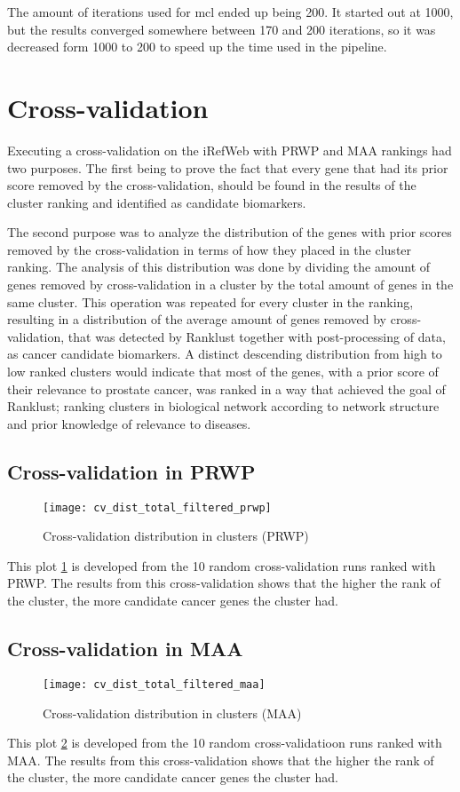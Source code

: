 The amount of iterations used for \gls{mcl} ended up being 200. It started out
at 1000, but the results converged somewhere between 170 and 200 iterations, so
it was decreased form 1000 to 200 to speed up the time used in the
\gls{pipeline}.

\section{Cross-validation}
Executing a cross-validation on the iRefWeb with PRWP and MAA rankings had two
purposes. The first being to prove the fact that every gene that had its prior
score removed by the cross-validation, should be found in the results of the
cluster ranking and identified as candidate biomarkers. 

The second purpose was to analyze the distribution of the genes with prior
scores removed by the cross-validation in terms of how they placed in the
cluster ranking. The analysis of this distribution was done by dividing the
amount of genes removed by cross-validation in a cluster by the total amount of
genes in the same cluster. This operation was repeated for every cluster in the
ranking, resulting in a distribution of the average amount of genes removed by
cross-validation, that was detected by Ranklust together with post-processing of
data, as cancer candidate biomarkers. A distinct descending distribution from
high to low ranked clusters would indicate that most of the genes, with a prior
score of their relevance to prostate cancer, was ranked in a way that achieved
the goal of Ranklust; ranking clusters in biological network according to
network structure and prior knowledge of relevance to diseases.

\subsection{Cross-validation in PRWP}
\hspace*{-2cm}\begin{figure}[H]
    \label{fig:irefweb-prwp}
    \texttt{[image: cv\_dist\_total\_filtered\_prwp]}
    \caption{Cross-validation distribution in clusters (PRWP)}
\end{figure}
This plot \ref{fig:irefweb-prwp} is developed from the 10 random
cross-validation runs ranked with PRWP. The results from this cross-validation
shows that the higher the rank of the cluster, the more candidate cancer genes
the cluster had.

\subsection{Cross-validation in MAA}
\hspace*{-2cm}\begin{figure}[H]
    \label{fig:irefweb-maa}
    \texttt{[image: cv\_dist\_total\_filtered\_maa]}
    \caption{Cross-validation distribution in clusters (MAA)}
\end{figure}
This plot \ref{fig:irefweb-maa} is developed from the 10 random
cross-validatioon runs ranked with MAA. The results from this cross-validation
shows that the higher the rank of the cluster, the more candidate cancer genes
the cluster had.

